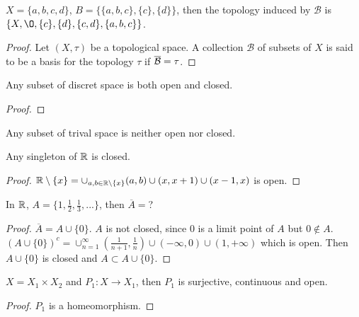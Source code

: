 \begin{exercise}{}{}
    $X=\{a,b,c,d\}$, $B=\{\{a,b,c\},\{c\},\{d\}\}$,
    then the topology induced by $\mathcal{B}$ is $\{X,\O,\{c\},\{d\},\{c,d\},\{a,b,c\}\}$.
\end{exercise}

\begin{proof}
    Let $(X,\tau)$ be a topological space. 
    A collection $\mathcal{B}$ of subsets of $X$ is said to be a basis for the topology $\tau$
    if $\overline{\mathcal{B}}=\tau$.
\end{proof}

\begin{exercise}{}{}
    Any subset of discret space is both open and closed.
\end{exercise}
\begin{proof}
    
\end{proof}

\begin{exercise}{}{}
    Any subset of trival space is neither open nor closed.
\end{exercise}

\begin{exercise}{}{}
    Any singleton of $\mathbb{R}$ is closed.
\end{exercise}

\begin{proof}
    $\mathbb{R}\setminus \{x\}=\cup_{a,b\in \mathbb{R}\setminus \{x\}}(a,b)\cup (x,x+1)\cup (x-1,x)$ is open.
\end{proof}

\begin{exercise}{}{}
    In $\mathbb{R}$, $A=\{1,\frac{1}{2},\frac{1}{3},...\}$, then $\overline{A}=$?
\end{exercise}

\begin{proof}
    $\overline{A}=A\cup \{0\}$. $A$ is not closed, since $0$ is a limit point of $A$ but $0\notin A$.
    $(A\cup \{0\})^c=\cup_{n=1}^{\infty} (\frac{1}{n+1},\frac{1}{n})\cup (-\infty,0)\cup (1,+\infty)$ which is open.
    Then $A\cup \{0\}$ is closed and $A\subset A\cup\{0\}$.
\end{proof}

\begin{exercise}{}{}
    $X=X_1\times X_2$ and $P_1:X\rightarrow X_1$, then $P_1$ is surjective, continuous and open.
\end{exercise}

\begin{proof}
    $P_1$ is a homeomorphism.
\end{proof}


